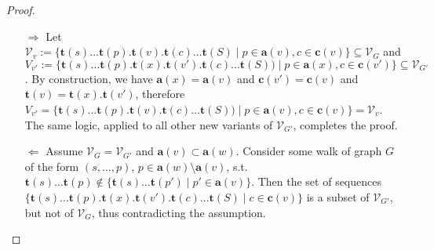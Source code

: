 \documentclass[a4paper]{article}
\newtheorem{conjecture}{Conjecture}
\newcommand{\prefix}{\mathbf{p}}
\newcommand{\parent}{\mathbf{a}}
\newcommand{\child}{\mathbf{c}}
\newcommand{\seq}{\mathbf{t}}
\begin{document}
\begin{proof}
    \begin{enumerate}
        \item[$\Rightarrow$] Let $\mathcal V_v := 
            \{\seq(s)\ldots\seq(p).\seq(v).\seq(c)\ldots\seq(S) \mid p \in
            \parent(v), c \in \child(v) \} \subseteq \mathcal V_{G}$ and 
            $V_{v'} :=
            \{\seq(s)\ldots\seq(p).\seq(x).\seq(v').\seq(c)\ldots\seq(S)) \mid
            p \in \parent(x), c \in \child(v') \}\subseteq \mathcal V_{G'}$.
            By construction, we have $\parent(x) = \parent(v)$ and $\child(v')
            = \child(v)$ and $\seq(v) = \seq(x).\seq(v')$, therefore $V_{v'} =
            \{\seq(s)\ldots\seq(p).\seq(v).\seq(c)\ldots\seq(S)) \mid p \in
            \parent(v), c \in \child(v) \} = \mathcal V_v$. The same logic,
            applied to all other new variants of $\mathcal V_{G'}$, completes
            the proof. 

    \item[$\Leftarrow$] Assume $\mathcal V_G = \mathcal V_{G'}$ and $\parent(v)
        \subset \parent(w)$. Consider some walk of graph $G$ of the form $(s,
        \ldots, p)$, $p \in \parent(w) \setminus \parent(v)$, s.t.
        $\seq(s)\ldots\seq(p) \not\in \{\seq(s)\ldots\seq(p') \mid p' \in
        \parent(v)\}$. Then the set of sequences
        $\{\seq(s)\ldots\seq(p).\seq(x).\seq(v').\seq(c)\ldots\seq(S) \mid c
        \in \child(v)\}$ is a subset of $\mathcal V_{G'}$, but not of $\mathcal
        V_{G}$, thus contradicting the assumption. 
    \end{enumerate}
\end{proof}

\end{document}
